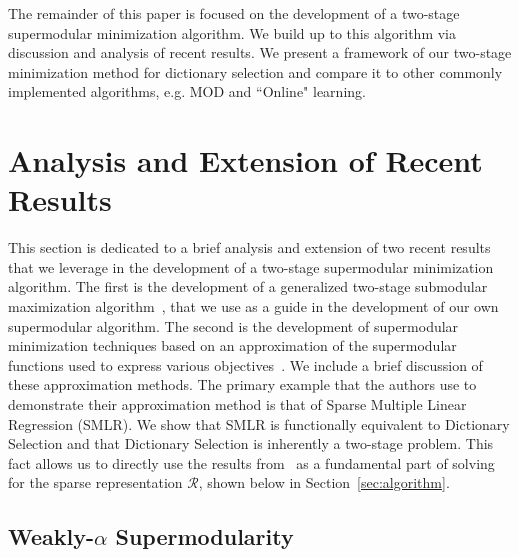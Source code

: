 \documentclass{article}
\newcommand{\Rr}{\mathcal{R}}
\begin{document}
\noindent The remainder of this paper is focused on the development of a two-stage supermodular minimization algorithm. We build up to this algorithm via discussion and analysis of recent results. We present a framework of our two-stage minimization method for dictionary selection and compare it to other commonly implemented algorithms, e.g. MOD and  ``Online" learning.

\section{Analysis and Extension of Recent Results}\label{sec:recentresults}

This section is dedicated to a brief analysis and extension of two recent results that we leverage in the development of a two-stage supermodular minimization algorithm. The first is the development of a generalized two-stage submodular maximization algorithm~\cite{Singer16TwoStage}, that we use as a guide in the development of our own supermodular algorithm. The second is the development of supermodular minimization techniques based on an approximation of the supermodular functions used to express various objectives~\cite{weaklyalpha}. We include a brief discussion of these approximation methods. The primary example that the authors use to demonstrate their approximation method is that of Sparse Multiple Linear Regression (SMLR). We show that SMLR is functionally equivalent to Dictionary Selection and that Dictionary Selection is inherently a two-stage problem. This fact allows us to directly use the results from~\cite{weaklyalpha} as a fundamental part of solving for the sparse representation $\Rr$, shown below in Section~\ref{sec:algorithm}.

\subsection{Weakly-$\alpha$ Supermodularity} \label{weakalpha}
\end{document}
